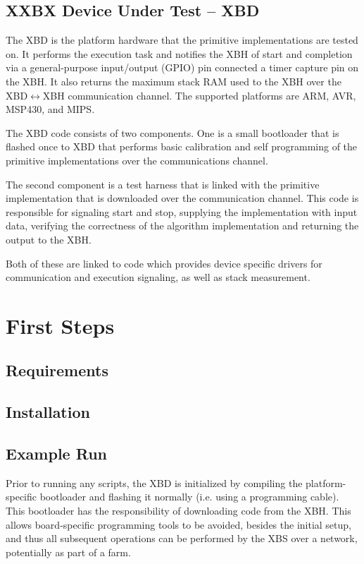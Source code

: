 \documentclass[twoside,11pt]{cergdoc}
\begin{document}
  \section{XXBX Device Under Test -- XBD}
The XBD is the platform hardware that the primitive implementations are tested
on. It performs the execution task and
notifies the XBH of start and completion via a general-purpose input/output
(GPIO) pin connected a timer capture pin on the XBH. It also returns the maximum
stack RAM used to the XBH over the XBD$\leftrightarrow$XBH communication
    channel. The supported platforms are ARM, AVR, MSP430, and MIPS. 

The XBD code consists of two components. One is a small bootloader that is
flashed once to XBD that performs basic calibration and self programming of the
primitive implementations over the communications channel. 

The second component is a test harness that is linked with the
primitive implementation that is downloaded over the communication channel. This
code is responsible for signaling start and stop, supplying the implementation
with input data, verifying the correctness of the algorithm implementation and
returning the output to the XBH. 

Both of these are linked to code which provides device specific drivers for
communication and execution signaling, as well as stack measurement. 


\chapter{First Steps}
  \section{Requirements}
  \section{Installation}
  \section{Example Run}
Prior to running any scripts, the XBD is initialized by compiling the
platform-specific bootloader and flashing it normally (i.e. using a programming
cable). 
This bootloader has the responsibility of downloading code from the XBH. This allows board-specific
programming tools to be avoided, besides the initial setup, and thus all
subsequent operations can be performed by the XBS over a network, potentially as
part of a farm.
\end{document}
